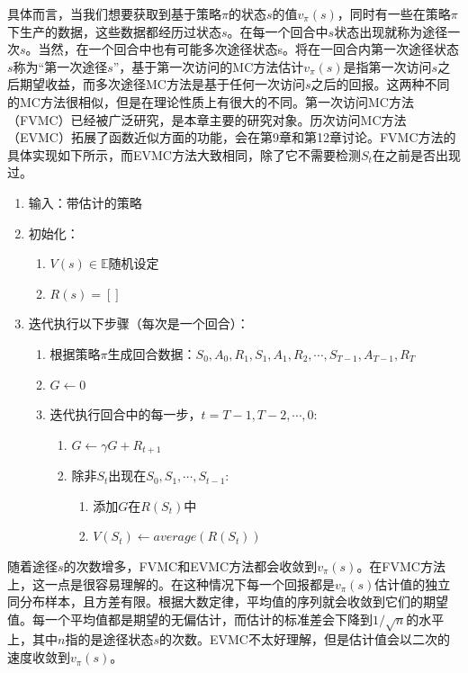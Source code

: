 \documentclass{ctexart}
\begin{document}
            具体而言，当我们想要获取到基于策略$\pi$的状态$s$的值$v_{\pi}(s)$，同时有一些在策略$\pi$下生产的数据，这些数据都经历过状态$s$。在每一个回合中$s$状态出现就称为途径一次$s$。当然，在一个回合中也有可能多次途径状态s。将在一回合内第一次途径状态$s$称为“第一次途径$s$”，基于第一次访问的MC方法估计$v_{\pi}(s)$是指第一次访问$s$之后期望收益，而多次途径MC方法是基于任何一次访问$s$之后的回报。这两种不同的MC方法很相似，但是在理论性质上有很大的不同。第一次访问MC方法（FVMC）已经被广泛研究，是本章主要的研究对象。历次访问MC方法（EVMC）拓展了函数近似方面的功能，会在第9章和第12章讨论。FVMC方法的具体实现如下所示，而EVMC方法大致相同，除了它不需要检测$S_t$在之前是否出现过。
            \begin{enumerate}
                \item 输入：带估计的策略
                \item 初始化：
                \begin{enumerate}
                    \item $V(s)\in \mathbb{E}$随机设定
                    \item $R(s)=[]$
                \end{enumerate}
                \item 迭代执行以下步骤（每次是一个回合）：
                \begin{enumerate}
                    \item 根据策略$\pi$生成回合数据：$S_0,A_0,R_1,S_1,A_1,R_2,\cdots,S_{T-1},A_{T-1},R_T$
                    \item $G \leftarrow 0$
                    \item 迭代执行回合中的每一步，$t = T-1,T-2,\cdots,0$:
                    \begin{enumerate}
                        \item $G\leftarrow \gamma G + R_{t+1}$
                        \item 除非$S_t$出现在$S_0,S_1,\cdots,S_{t-1}$:
                            \begin{enumerate}
                                \item 添加$G$在$R(S_t)$中
                                \item $V(S_t) \leftarrow average(R(S_t))$
                            \end{enumerate}
                    \end{enumerate}
                \end{enumerate}
            \end{enumerate}
            随着途径$s$的次数增多，FVMC和EVMC方法都会收敛到$v_{\pi}(s)$。在FVMC方法上，这一点是很容易理解的。在这种情况下每一个回报都是$v_{\pi}(s)$估计值的独立同分布样本，且方差有限。根据大数定律，平均值的序列就会收敛到它们的期望值。每一个平均值都是期望的无偏估计，而估计的标准差会下降到$1/\sqrt{n}$的水平上，其中$n$指的是途径状态$s$的次数。EVMC不太好理解，但是估计值会以二次的速度收敛到$v_{\pi}(s)$。
            
\end{document}
